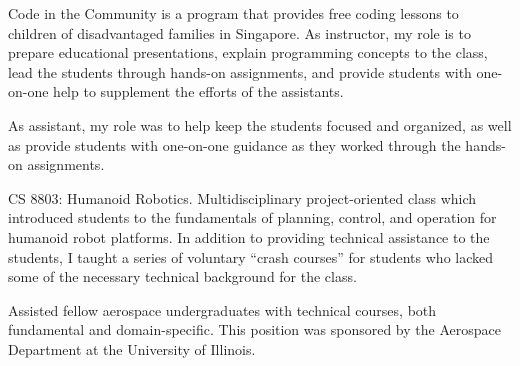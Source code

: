 
Code in the Community is a program that provides free coding lessons to children of disadvantaged families in Singapore. As instructor, my role is to prepare educational presentations, explain programming concepts to the class, lead the students through hands-on assignments, and provide students with one-on-one help to supplement the efforts of the assistants.

\divider

As assistant, my role was to help keep the students focused and organized, as well as provide students with one-on-one guidance as they worked through the hands-on assignments.

\divider

CS 8803: Humanoid Robotics. Multidisciplinary project-oriented class which introduced students to the fundamentals of planning, control, and operation for humanoid robot platforms. In addition to providing technical assistance to the students, I taught a series of voluntary ``crash courses'' for students who lacked some of the necessary technical background for the class.

\divider

Assisted fellow aerospace undergraduates with technical courses, both fundamental and domain-specific. This position was sponsored by the Aerospace Department at the University of Illinois.